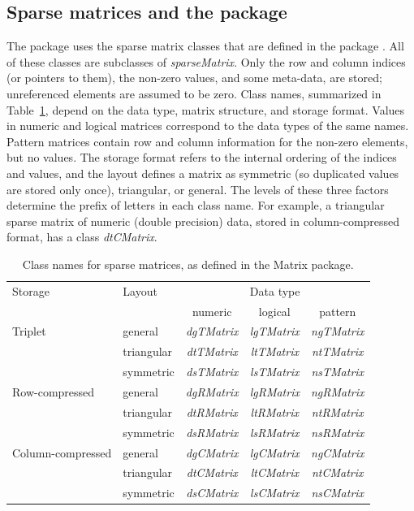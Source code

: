\documentclass[jss]{jss}\usepackage[]{graphicx}\usepackage[]{color}
\newcommand{\class}[1]{\textsl{#1}}
\begin{document}
\subsection[Sparse matrices in R]{Sparse matrices and the 
  package}\label{sec:Rsparse}

The  package uses the sparse matrix classes that are defined
in the  package \citep{R_Matrix}.  All of these classes are subclasses of
\class{sparseMatrix}. Only the row and column
indices (or pointers to them), the non-zero values, and some
meta-data, are stored; unreferenced elements are assumed to be
zero. Class names, summarized in Table~\ref{tab:MatrixClasses}, depend on the data type, matrix structure,
and storage format. Values in numeric and logical matrices correspond to the
 data types of the same names.  Pattern matrices contain
row and column information for the non-zero elements, but no
values. The storage format refers to the internal ordering of the
indices and values, and the layout defines a matrix as symmetric (so
duplicated values are stored only once), triangular, or general.  The
levels of these three factors determine the prefix of letters in each
class name. For example, a triangular sparse matrix of numeric (double
precision) data, stored in
column-compressed format, has a class \class{dtCMatrix}.

\begin{table}[tbh]\centering
  \begin{tabular}{ll|ccc}
      \toprule
   Storage&Layout&\multicolumn{3}{c}{Data type}\\
    &&numeric&logical&pattern\\
    \midrule
    Triplet&general&\class{dgTMatrix}&\class{lgTMatrix}&\class{ngTMatrix}\\
    &triangular&\class{dtTMatrix}&\class{ltTMatrix}&\class{ntTMatrix}\\
      &symmetric&\class{dsTMatrix}&\class{lsTMatrix}&\class{nsTMatrix}\\
    \midrule
        Row-compressed&general&\class{dgRMatrix}&\class{lgRMatrix}&\class{ngRMatrix}\\
    &triangular&\class{dtRMatrix}&\class{ltRMatrix}&\class{ntRMatrix}\\
      &symmetric&\class{dsRMatrix}&\class{lsRMatrix}&\class{nsRMatrix}\\
    \midrule
            Column-compressed&general&\class{dgCMatrix}&\class{lgCMatrix}&\class{ngCMatrix}\\
    &triangular&\class{dtCMatrix}&\class{ltCMatrix}&\class{ntCMatrix}\\
      &symmetric&\class{dsCMatrix}&\class{lsCMatrix}&\class{nsCMatrix}\\
\bottomrule
  \end{tabular}
    \caption{Class names for sparse matrices, as defined in the
    Matrix package.}\label{tab:MatrixClasses}
\end{table}
\end{document}
